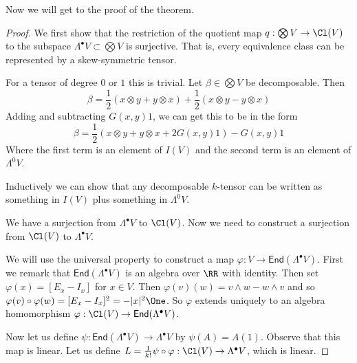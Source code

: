 Now we will get to the proof of the theorem.
\begin{proof}
    We first show that the restriction of the quotient map $q : \bigotimes V \to \Cl(V)$ to the subspace $\Lambda^\bullet V \subset\bigotimes V$ is surjective. That is, every equivalence class can be represented by a skew-symmetric tensor.

    For a tensor of degree $0$ or $1$ this is trivial. Let $\beta\in \bigotimes V$ be decomposable. Then 
    \[\beta = \frac{1}{2}(x\otimes y + y \otimes x) + \frac{1}{2}(x\otimes y - y\otimes x)\]
    Adding and subtracting $G(x,y)1$, we can get this to be in the form
    \[\beta=\frac{1}{2}(x\otimes y+y\otimes x+2G(x,y)1)-G(x,y)1\]
    Where the first term is an element of $I(V)$ and the second term is an element of $\Lambda^0 V$.

    Inductively we can show that any decomposable $k$-tensor can be written as something in $I(V)$ plus something in $\Lambda^0 V$.

    We have a surjection from $\Lambda^\bullet V$ to $\Cl(V)$. Now we need to construct a surjection from $\Cl(V)$ to $\Lambda^\bullet V$. 

    We will use the universal property to construct a map $\varphi : V \to \mathsf{End}(\Lambda^\bullet V)$. First we remark that $\mathsf{End}(\Lambda^\bullet V)$ is an algebra over $\RR$ with identity. Then set $\varphi(x) = [E_x - I_x]$ for $x \in V$. Then $\varphi(v)(w)=v\wedge w - w\wedge v$ and so $\varphi(v)\circ\varphi(w)=[E_x-I_x]^2=-|x|^2\One$. So $\varphi$ extends uniquely to an algebra homomorphism $\varphi : \Cl(V) \to \mathsf{End}(\Lambda^\bullet V)$.

    Now let us define $\psi : \mathsf{End}(\Lambda^\bullet V) \to \Lambda^\bullet V$ by $\psi(A) = A(1)$. Observe that this map is linear. Let us define $L = \frac{1}{k!}\psi\circ \varphi : \Cl(V) \to \Lambda^\bullet V$, which is linear.


\end{proof}
